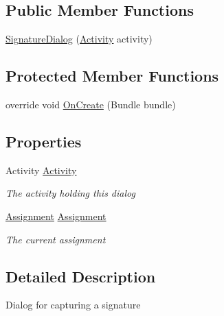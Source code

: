 \subsection*{Public Member Functions}
\begin{DoxyCompactItemize}
\item 
\hyperlink{class_field_service_1_1_android_1_1_dialogs_1_1_signature_dialog_ac6930ff1a9975dc66acf8fdfd5b59656}{Signature\+Dialog} (\hyperlink{class_field_service_1_1_android_1_1_dialogs_1_1_signature_dialog_a266b81d93f063bf3872a59c2625b53fd}{Activity} activity)
\end{DoxyCompactItemize}
\subsection*{Protected Member Functions}
\begin{DoxyCompactItemize}
\item 
override void \hyperlink{class_field_service_1_1_android_1_1_dialogs_1_1_signature_dialog_ac56b89c5b575b795bd4d82e608f83c72}{On\+Create} (Bundle bundle)
\end{DoxyCompactItemize}
\subsection*{Properties}
\begin{DoxyCompactItemize}
\item 
Activity \hyperlink{class_field_service_1_1_android_1_1_dialogs_1_1_signature_dialog_a266b81d93f063bf3872a59c2625b53fd}{Activity}
\begin{DoxyCompactList}\small\item\em The activity holding this dialog \end{DoxyCompactList}\item 
\hyperlink{class_field_service_1_1_data_1_1_assignment}{Assignment} \hyperlink{class_field_service_1_1_android_1_1_dialogs_1_1_signature_dialog_a4a9650b542756aa1937638c19c61d4d9}{Assignment}
\begin{DoxyCompactList}\small\item\em The current assignment \end{DoxyCompactList}\end{DoxyCompactItemize}


\subsection{Detailed Description}
Dialog for capturing a signature 



